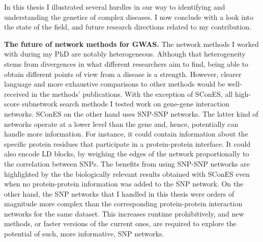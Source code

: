 \documentclass[
  11pt,
]{env/yjiao}
\begin{document}
In this thesis I illustrated several hurdles in our way to identifying and understanding the genetics of complex diseases. I now conclude with a look into the state of the field, and future research directions related to my contribution.

\textbf{The future of network methods for GWAS.} The network methods I worked with during my PhD are notably heterogeneous. Although that heterogeneity stems from divergences in what different researchers aim to find, being able to obtain different points of view from a disease is a strength. However, clearer language and more exhaustive comparisons to other methods would be well-received in the methods' publications. With the exception of SConES, all high-score subnetwork search methods I tested work on gene-gene interaction networks. SConES on the other hand uses SNP-SNP networks. The latter kind of networks operate at a lower level than the gene and, hence, potentially can handle more information. For instance, it could contain information about the specific protein residues that participate in a protein-protein interface. It could also encode LD blocks, by weighing the edges of the network proportionally to the correlation between SNPs. The benefits from using SNP-SNP networks are highlighted by the the biologically relevant results obtained with SConES even when no protein-protein information was added to the SNP network. On the other hand, the SNP networks that I handled in this thesis were orders of magnitude more complex than the corresponding protein-protein interaction networks for the same dataset. This increases runtime prohibitively, and new methods, or faster versions of the current ones, are required to explore the potential of such, more informative, SNP networks.
\end{document}
